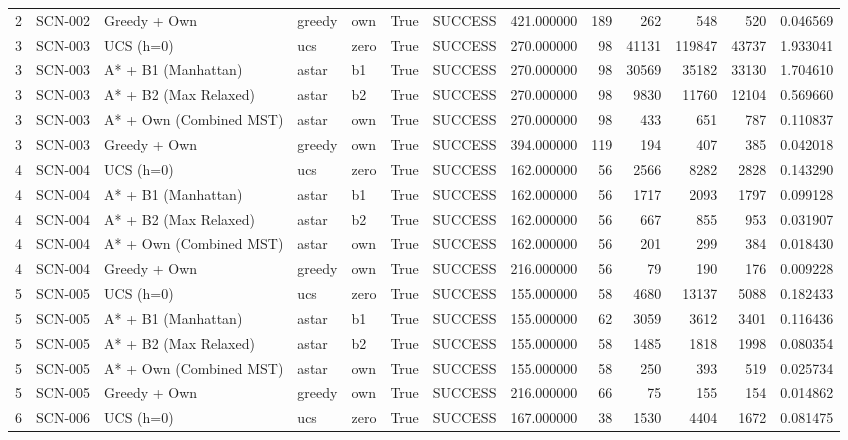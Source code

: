 \begin{table}[htbp]
\begin{tabular}{rllllrlrrrrrr}
2 & SCN-002 & Greedy + Own & greedy & own & True & SUCCESS & 421.000000 & 189 & 262 & 548 & 520 & 0.046569 \\
3 & SCN-003 & UCS (h=0) & ucs & zero & True & SUCCESS & 270.000000 & 98 & 41131 & 119847 & 43737 & 1.933041 \\
3 & SCN-003 & A* + B1 (Manhattan) & astar & b1 & True & SUCCESS & 270.000000 & 98 & 30569 & 35182 & 33130 & 1.704610 \\
3 & SCN-003 & A* + B2 (Max Relaxed) & astar & b2 & True & SUCCESS & 270.000000 & 98 & 9830 & 11760 & 12104 & 0.569660 \\
3 & SCN-003 & A* + Own (Combined MST) & astar & own & True & SUCCESS & 270.000000 & 98 & 433 & 651 & 787 & 0.110837 \\
3 & SCN-003 & Greedy + Own & greedy & own & True & SUCCESS & 394.000000 & 119 & 194 & 407 & 385 & 0.042018 \\
4 & SCN-004 & UCS (h=0) & ucs & zero & True & SUCCESS & 162.000000 & 56 & 2566 & 8282 & 2828 & 0.143290 \\
4 & SCN-004 & A* + B1 (Manhattan) & astar & b1 & True & SUCCESS & 162.000000 & 56 & 1717 & 2093 & 1797 & 0.099128 \\
4 & SCN-004 & A* + B2 (Max Relaxed) & astar & b2 & True & SUCCESS & 162.000000 & 56 & 667 & 855 & 953 & 0.031907 \\
4 & SCN-004 & A* + Own (Combined MST) & astar & own & True & SUCCESS & 162.000000 & 56 & 201 & 299 & 384 & 0.018430 \\
4 & SCN-004 & Greedy + Own & greedy & own & True & SUCCESS & 216.000000 & 56 & 79 & 190 & 176 & 0.009228 \\
5 & SCN-005 & UCS (h=0) & ucs & zero & True & SUCCESS & 155.000000 & 58 & 4680 & 13137 & 5088 & 0.182433 \\
5 & SCN-005 & A* + B1 (Manhattan) & astar & b1 & True & SUCCESS & 155.000000 & 62 & 3059 & 3612 & 3401 & 0.116436 \\
5 & SCN-005 & A* + B2 (Max Relaxed) & astar & b2 & True & SUCCESS & 155.000000 & 58 & 1485 & 1818 & 1998 & 0.080354 \\
5 & SCN-005 & A* + Own (Combined MST) & astar & own & True & SUCCESS & 155.000000 & 58 & 250 & 393 & 519 & 0.025734 \\
5 & SCN-005 & Greedy + Own & greedy & own & True & SUCCESS & 216.000000 & 66 & 75 & 155 & 154 & 0.014862 \\
6 & SCN-006 & UCS (h=0) & ucs & zero & True & SUCCESS & 167.000000 & 38 & 1530 & 4404 & 1672 & 0.081475 \\

\end{tabular}
\end{table}
